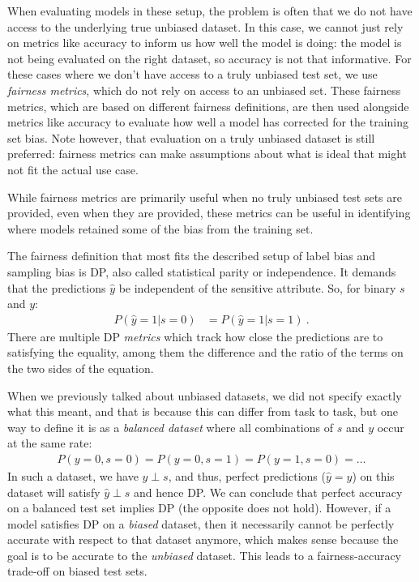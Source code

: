 When evaluating models in these setup,
the problem is often that we do not have access to the underlying true unbiased dataset.
In this case, we cannot just rely on metrics like accuracy to inform us how well the model is doing:
the model is not being evaluated on the right dataset, so accuracy is not that informative.
For these cases where we don't have access to a truly unbiased test set,
we use \emph{fairness metrics}, which do not rely on access to an unbiased set.
These fairness metrics, which are based on different fairness definitions,
are then used alongside metrics like accuracy to evaluate how well a model has corrected for the training set bias.
Note however, that evaluation on a truly unbiased dataset is still preferred:
fairness metrics can make assumptions about what is ideal that might not fit the actual use case.

While fairness metrics are primarily useful when no truly unbiased test sets are provided,
even when they are provided,
these metrics can be useful in identifying where models retained some of the bias from the training set.

The fairness definition that most fits the described setup of label bias and sampling bias is \ac{DP},
also called statistical parity or independence.
It demands that the predictions $\hat{y}$ be independent of the sensitive attribute.
So, for binary $s$ and $y$:
\begin{align}
  P(\hat{y}=1|s=0) &= P(\hat{y}=1|s=1)~.
  \label{eq:dp-def}
\end{align}
There are multiple \ac{DP} \emph{metrics} which track how close the predictions are to satisfying the equality,
among them the difference and the ratio of the terms on the two sides of the equation.

When we previously talked about unbiased datasets,
we did not specify exactly what this meant,
and that is because this can differ from task to task,
but one way to define it is as a \emph{balanced dataset} where all combinations of $s$ and $y$ occur at the same rate:
\begin{align}
  \label{eq:balanced-dataset}
  P(y=0,s=0)=P(y=0,s=1)=P(y=1,s=0)=\dots
\end{align}
In such a dataset, we have $y \perp s$, and thus,
perfect predictions ($\hat{y}=y$) on this dataset will satisfy $\hat{y} \perp s$ and hence \ac{DP}.
We can conclude that perfect accuracy on a balanced test set implies \acl{DP} (the opposite does not hold).
However, if a model satisfies \ac{DP} on a \emph{biased} dataset,
then it necessarily cannot be perfectly accurate with respect to that dataset anymore,
which makes sense because the goal is to be accurate to the \emph{unbiased} dataset.
This leads to a fairness-accuracy trade-off on biased test sets.

